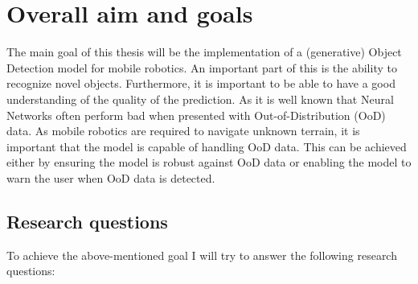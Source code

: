 \section{Overall aim and goals}\label{sec:goals}
The main goal of this thesis will be the implementation of a (generative) Object Detection model for mobile robotics. An important part of this is the ability to recognize novel objects. Furthermore, it is important to be able to have a good understanding of the quality of the prediction. As it is well known that Neural Networks often perform bad when presented with Out-of-Distribution (OoD) data. As mobile robotics are required to navigate unknown terrain, it is important that the model is capable of handling OoD data. This can be achieved either by ensuring the model is robust against OoD data or enabling the model to warn the user when OoD data is detected.




\subsection{Research questions}
To achieve the above-mentioned goal I will try to answer the following research questions:

